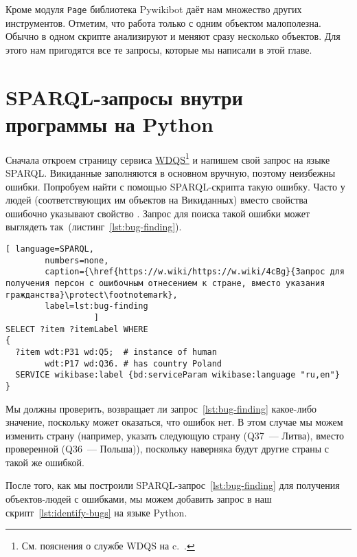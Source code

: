 Кроме модуля \lstinline|Page| библиотека Pywikibot даёт нам множество других инструментов. 
Отметим, что работа только с одним объектом малополезна. 
Обычно в одном скрипте анализируют и меняют сразу несколько объектов. 
Для этого нам пригодятся все те запросы, которые мы написали в этой главе.


\section{SPARQL-запросы внутри программы на Python}
\label{sec:running queries}

Сначала откроем страницу сервиса \href{https://query.wikidata.org/}{WDQS}\footnote[][0pt]{%
См. пояснения о службе WDQS на c.~\pageref{sect:WDQS}.%
}%
 и напишем свой запрос на языке SPARQL. 
Викиданные заполняются в основном вручную, поэтому неизбежны ошибки. 
Попробуем найти с помощью SPARQL-скрипта такую ошибку. 
Часто у людей (соответствующих им объектов на Викиданных) 
вместо свойства  
ошибочно указывают свойство . 
Запрос для поиска такой ошибки может выглядеть так~(листинг~\ref{lst:bug-finding}).

\begin{lstlisting}[ language=SPARQL,
        numbers=none,
        caption={\href{https://w.wiki/https://w.wiki/4cBg}{Запрос для получения персон с ошибочным отнесением к стране, вместо указания гражданства}\protect\footnotemark},
        label=lst:bug-finding
                  ]
SELECT ?item ?itemLabel WHERE 
{
  ?item wdt:P31 wd:Q5;  # instance of human
        wdt:P17 wd:Q36. # has country Poland
  SERVICE wikibase:label {bd:serviceParam wikibase:language "ru,en"}
}
\end{lstlisting}

Мы должны проверить, возвращает ли запрос~\ref{lst:bug-finding} какое-либо значение, 
поскольку может оказаться, что ошибок нет. 
В этом случае мы можем изменить страну 
(например, указать следующую страну (Q37~--- Литва), вместо проверенной (Q36~--- Польша)), 
поскольку наверняка будут другие страны с такой же ошибкой.

После того, как мы построили SPARQL-запрос~\ref{lst:bug-finding} для получения объектов-людей с ошибками, 
мы можем добавить запрос в наш скрипт~\ref{lst:identify-bugs} на языке Python.

